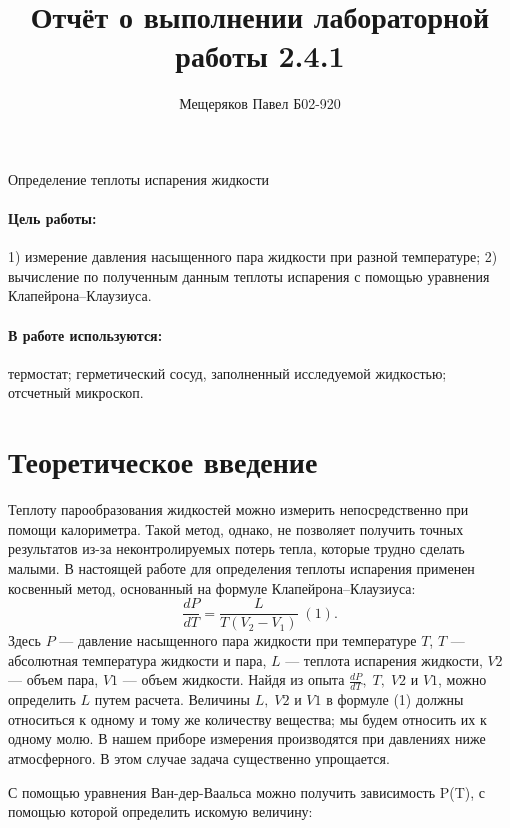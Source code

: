\documentclass[a4paper,12pt]{article}
\author{Мещеряков Павел Б02-920}
\title{Отчёт о выполнении лабораторной работы 2.4.1}
\begin{document}
	\maketitle
	\begin{center}
		{\Large Определение теплоты испарения жидкости}
	\end{center}

\paragraph*{Цель работы:} 1) измерение давления насыщенного пара жидкости при разной температуре; 2) вычисление по полученным данным теплоты испарения с помощью уравнения Клапейрона–Клаузиуса.
\paragraph*{В работе используются:} термостат; герметический сосуд, заполненный исследуемой жидкостью; отсчетный микроскоп.

\section{Теоретическое введение}
Теплоту парообразования жидкостей можно измерить непосредственно при помощи калориметра. Такой метод, однако, не позволяет получить точных результатов из-за неконтролируемых потерь тепла, которые трудно сделать малыми. В настоящей работе для определения теплоты испарения применен
косвенный метод, основанный на формуле Клапейрона–Клаузиуса: $$\frac{dP}
{dT} = \frac{L}{T(V_2 - V_1)}\;(1).$$
Здесь $P$ — давление насыщенного пара жидкости при температуре $T$, $T$ — абсолютная температура жидкости и пара, $L$ — теплота испарения жидкости, $V2$ — объем пара, $V1$ — объем жидкости. Найдя из опыта $\frac{dP}{dT},\; T,\; V2$ и $V1$, можно определить $L$ путем расчета. Величины $L, \;V2$ и $V1$ в формуле (1) должны относиться к одному и тому же количеству вещества; мы будем относить их к одному молю.
В нашем приборе измерения производятся при давлениях ниже атмосферного. В этом случае задача существенно упрощается.

С помощью уравнения Ван-дер-Ваальса можно получить зависимость P(T), с помощью которой определить искомую величину:
\end{document}
